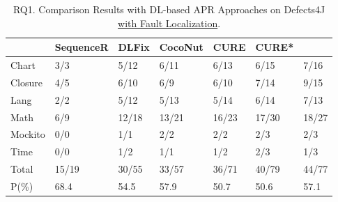 %









\begin{table}[t]
  \caption{RQ1. Comparison Results with DL-based APR Approaches on Defects4J \underline {with Fault Localization}.}
  \vspace{-6pt}
  {\small
			\begin{center}
				\renewcommand{\arraystretch}{1}
				\begin{tabular}{p{0.8cm}<{\centering}|p{1.2cm}<{\centering}|p{0.9cm}<{\centering}|p{1cm}<{\centering}|p{0.8cm}<{\centering}|p{0.8cm}<{\centering}|p{0.8cm}<{\centering}}
					
					\hline
					&\textbf{SequenceR}&\textbf{DLFix}& \textbf{CocoNut}&\textbf{CURE}&\textbf{CURE*}&\textbf{\tool}\\
					\hline
					Chart  & 3/3   & 5/12  & 6/11  & 6/13  & 6/15 & 7/16\\
					Closure& 4/5   & 6/10  & 6/9   & 6/10  & 7/14 & 9/15\\
					Lang   & 2/2   & 5/12  & 5/13  & 5/14  & 6/14  & 7/13\\
					Math    & 6/9  & 12/18 & 13/21 & 16/23 & 17/30 & 18/27\\
					Mockito & 0/0   & 1/1   & 2/2   & 2/2  & 2/3  & 2/3\\
					Time    & 0/0   & 1/2   & 1/1   & 1/2  & 2/3  & 1/3\\
					\hline
					Total   & 15/19 & 30/55 & 33/57 & 36/71 & 40/79 & 44/77\\
					\hline
					P(\%)  & 68.4  & 54.5  & 57.9  & 50.7  & 50.6  & 57.1\\
					\hline
				\end{tabular}
				\label{RQ1_defects4J_with_FL}
			\end{center}
                }
		\end{table}















